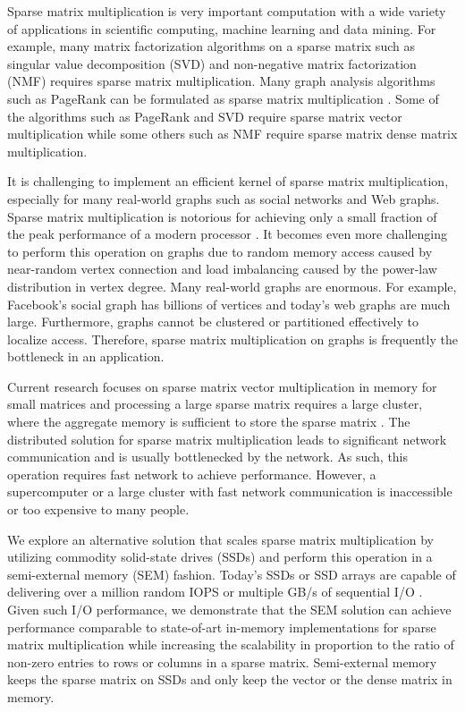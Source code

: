 Sparse matrix multiplication is very important computation with a wide variety
of applications in scientific computing, machine learning and data mining.
For example, many matrix factorization algorithms on a sparse matrix such as
singular value decomposition (SVD) \cite{svd} and non-negative matrix
factorization (NMF) \cite{nmf} requires sparse matrix multiplication.
Many graph analysis algorithms such as PageRank \cite{pagerank} can be
formulated as sparse matrix multiplication \cite{Mattson13}. Some of
the algorithms such as PageRank and SVD require sparse matrix vector
multiplication while some others such as NMF require sparse matrix dense
matrix multiplication.


It is challenging to implement an efficient kernel of sparse matrix
multiplication, especially for many real-world graphs such as social networks
and Web graphs. Sparse matrix multiplication is notorious for achieving only
a small fraction of the peak performance of a modern processor \cite{Williams07}.
It becomes even more challenging to perform this operation on graphs due to
random memory access caused by near-random vertex connection and load imbalancing
caused by the power-law distribution in vertex degree. Many real-world graphs
are enormous. For example, Facebook's social graph has billions of vertices
and today's web graphs are much large. Furthermore, graphs cannot be
clustered or partitioned effectively \cite{leskovec} to localize access.
Therefore, sparse matrix multiplication on graphs is frequently the bottleneck
in an application.

Current research focuses on sparse matrix vector multiplication in memory for
small matrices and processing a large sparse matrix requires a large cluster,
where the aggregate memory is sufficient to store the sparse matrix \cite{}.
The distributed solution for sparse matrix multiplication leads to significant
network communication and is usually bottlenecked by the network.
As such, this operation requires fast network to achieve performance.
However, a supercomputer or a large cluster with fast network communication
is inaccessible or too expensive to many people.



We explore an alternative solution that scales sparse matrix multiplication
by utilizing commodity solid-state drives (SSDs) and perform this operation
in a semi-external memory (SEM) fashion. Today's SSDs or SSD arrays are capable
of delivering over a million random IOPS or multiple GB/s of sequential I/O
\cite{safs}. Given such I/O performance, we demonstrate that the SEM solution
can achieve performance comparable to state-of-art in-memory implementations
for sparse matrix multiplication while increasing the scalability in proportion
to the ratio of non-zero entries to rows or columns in a sparse matrix.
Semi-external memory \cite{flashgraph, Abello98} keeps the sparse matrix on SSDs
and only keep the vector or the dense matrix in memory.

